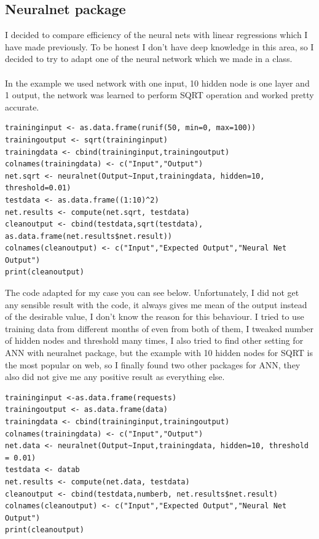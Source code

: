 \documentclass[english]{article}
\begin{document}
\subsection{Neuralnet package}
I decided to compare efficiency of the neural nets with linear regressions which I have made previously. To be honest I don't have deep knowledge in this area, so I decided to try to adapt one of the neural network which we made in a class.\\\\
In the example we used network with one input, 10 hidden node is one layer and 1 output, the network was learned to perform SQRT operation and worked pretty accurate. 
\begin{lstlisting}
traininginput <- as.data.frame(runif(50, min=0, max=100))
trainingoutput <- sqrt(traininginput) 
trainingdata <- cbind(traininginput,trainingoutput)
colnames(trainingdata) <- c("Input","Output") 
net.sqrt <- neuralnet(Output~Input,trainingdata, hidden=10, threshold=0.01)
testdata <- as.data.frame((1:10)^2) 
net.results <- compute(net.sqrt, testdata)
cleanoutput <- cbind(testdata,sqrt(testdata), as.data.frame(net.results$net.result)) 
colnames(cleanoutput) <- c("Input","Expected Output","Neural Net Output") 
print(cleanoutput) 
\end{lstlisting}
The code adapted for my case you can see below. Unfortunately, I did not get any sensible result with the code, it always gives me mean of the output instead of the desirable value, I don't know the reason for this behaviour. I tried to use training data from different months of even from both of them, I tweaked number of hidden nodes and threshold many times, I also tried to find other setting for ANN with neuralnet package, but the example with 10 hidden nodes for SQRT is the most popular on web, so I finally found two other packages for ANN, they also did not give me any positive result as everything else.
\begin{lstlisting}
traininginput <-as.data.frame(requests)
trainingoutput <- as.data.frame(data)
trainingdata <- cbind(traininginput,trainingoutput) 
colnames(trainingdata) <- c("Input","Output") 
net.data <- neuralnet(Output~Input,trainingdata, hidden=10, threshold = 0.01)
testdata <- datab
net.results <- compute(net.data, testdata)
cleanoutput <- cbind(testdata,numberb, net.results$net.result) 
colnames(cleanoutput) <- c("Input","Expected Output","Neural Net Output") 
print(cleanoutput) 
\end{lstlisting}
\end{document}
